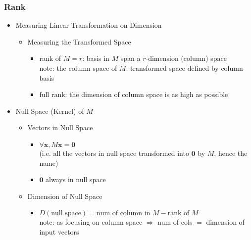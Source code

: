 \subsubsection{Rank}
\begin{itemize}
\item Measuring Linear Transformation on Dimension
	\begin{itemize}
	\item Measuring the Transformed Space
		\begin{itemize}
		\item rank of $M=r$: basis in $M$ span a $r$-dimension (column) space \\
		note: the column space of $M$: transformed space defined by column basis
		\item full rank: the dimension of column space is as high as possible
		\end{itemize}
	\end{itemize}
\item Null Space (Kernel) of $M$
	\begin{itemize}
	\item Vectors in Null Space
		\begin{itemize}
		\item $\forall \mathbf x, M\mathbf x = \mathbf 0$ \\
		(i.e. all the vectors in null space transformed into $\mathbf 0$ by $M$, hence the name)
		\item $\mathbf 0$ always in null space
		\end{itemize}
	\item Dimension of Null Space
		\begin{itemize}
		\item $D(\text{null space}) = \text{num of column in }M - \text{rank of }M$ \\
		note: as focusing on column space $\Rightarrow$ num of cols $=$ dimension of input vectors
		\end{itemize}
	\end{itemize}
	

\end{itemize}
